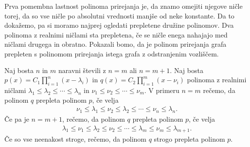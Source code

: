 Prva pomembna lastnost polinoma prirejanja je, da znamo omejiti njegove ničle torej, da so vse ničle po absolutni vrednosti manjše od neke konstante. Da to dokažemo, pa si moramo najprej ogledati prepletene družine polinomov. Dva polinoma z realnimi ničlami sta prepletena, če se ničle enega nahajajo med ničlami drugega in obratno. Pokazali bomo, da je polinom prirejanja grafa prepleten s polinomom prirejanja istega grafa z odstranjenim vozliščem.

\begin{definicija}\label{prepletena-polinoma}
    Naj bosta \(n\) in \(m\) naravni števili z \(n=m\) ali \(n=m+1\). Naj bosta \(p(x) = C_1 \prod_{i=1}^n (x-\lambda_i)\) in \(q(x) = C_2 \prod_{i=1}^m (x-\nu_i)\) polinoma z realnimi ničlami \(\lambda_1 \leq \lambda_2 \leq \cdots \leq \lambda_n\) in \(\nu_1 \leq \nu_2 \leq \cdots \leq \nu_m\). V primeru \(n=m\) rečemo, da polinom \(q\) prepleta polinom \(p\), če velja
    \begin{align*}
        \nu_1 \leq \lambda_1 \leq \nu_2 \leq \lambda_2 \leq \cdots \leq \nu_n \leq \lambda_n.
    \end{align*}
    Če pa je \(n=m+1\), rečemo, da polinom \(q\) prepleta polinom \(p\), če velja
    \begin{align*}
        \lambda_1 \leq \nu_1 \leq \lambda_2 \leq \nu_2 \leq \cdots \leq \lambda_m \leq \nu_m \leq \lambda_{m+1}.
    \end{align*}
    Če so vse neenakost stroge, rečemo, da polinom \(q\) strogo prepleta polinom \(p\).
\end{definicija}

